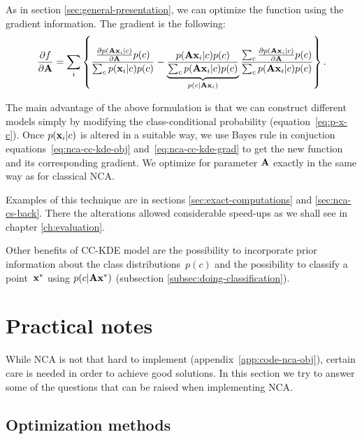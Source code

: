 	As in section \ref{sec:general-presentation}, we can optimize the function using the gradient information. The gradient is the following:
	\begin{align}
	    \frac{\partial f}{\partial \mathbf{A}} =
	      \sum_i \left\{
	                \frac
	                {
	                    \frac{\partial p(\mathbf{A}\mathbf{x}_i|c)}{\partial \mathbf{A}}p(c)
	                }
	                {
	                    \sum_c p(\mathbf{x}_i|c)p(c)
	                }
	                - \underbrace{\frac{
	                    p(\mathbf{A}\mathbf{x}_i|c)p(c)
	                }{
	                    \sum_c p(\mathbf{A}\mathbf{x}_i|c)p(c)
	                }}_{p(c|\mathbf{A}\mathbf{x}_i)}
	                \frac{
	                    \sum_c \frac{\partial p(\mathbf{A}\mathbf{x}_i|c)}{\partial \mathbf{A}}p(c)
	                }{
	                    \sum_c p(\mathbf{A}\mathbf{x}_i|c)p(c)
	                }
	             \right \}.
	    \label{eq:nca-cc-kde-grad}
	\end{align}

	The main advantage of the above formulation is that we can construct different models simply by modifying the class-conditional probability (equation~\eqref{eq:p-x-c}). Once $p(\mathbf{x}_i|c)$ is altered in a suitable way, we use Bayes rule in conjuction equations~\eqref{eq:nca-cc-kde-obj} and~\eqref{eq:nca-cc-kde-grad} to get the new function and its corresponding gradient. We optimize for parameter $\mathbf{A}$ exactly in the same way as for classical NCA.
	
	Examples of this technique are in sections \ref{sec:exact-computations} and \ref{sec:nca-cs-back}. There the alterations allowed considerable speed-ups as we shall see in chapter \ref{ch:evaluation}. 

	Other benefits of CC-KDE model are the possibility to incorporate prior information about the class distributions~$p(c)$ and the possibility to classify a point~$\mathbf{x}^*$ using $p(c|\mathbf{A}\mathbf{x}^*)$ (subsection \ref{subsec:doing-classification}).

\section{Practical notes}
\label{sec:practical-notes}

	While NCA is not that hard to implement (appendix~\ref{app:code-nca-obj}), certain care is needed in order to achieve good solutions.
	In this section we try to answer some of the questions 
	that can be raised when implementing NCA. 	

\subsection{Optimization methods}
\label{subsec:optimization}

